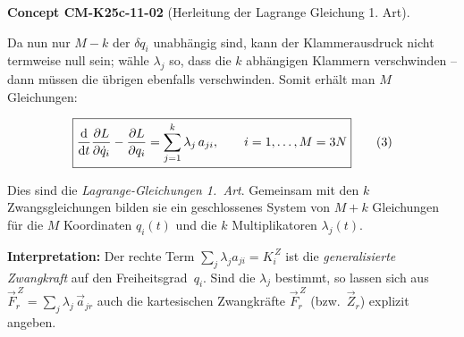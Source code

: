 \documentclass[10pt, letterpaper]{article}
\newcommand{\CustomHeading}[3]{%
  \par\medskip\noindent%
  \textbf{#1 #2} \textnormal{(#3)}.\enskip%
}
\newenvironment{CONC}[2]{\CustomHeading{Concept}{#1}{#2}}{}
\begin{document}
\begin{CONC}{CM-K25c-11-02}{Herleitung der Lagrange Gleichung 1. Art}
Da nun nur $M-k$ der $\delta q_i$ unabhängig sind, kann der Klammer­ausdruck
nicht termweise null sein; wähle $\lambda_j$ so, dass die $k$ abhängigen
Klammern verschwinden – dann müssen die übrigen ebenfalls verschwinden.
Somit erhält man $M$ Gleichungen:

\[
  \boxed{%
    \frac{\mathrm d}{\mathrm dt}
      \frac{\partial L}{\partial\dot q_i}
    -\frac{\partial L}{\partial q_i}
    =\sum_{j=1}^{k}\lambda_j\,a_{ji},
    \qquad
    i=1,\dots,M=3N
  }
  \tag{3}
\]

Dies sind die \emph{Lagrange-Gleichungen 1.\ Art}.  
Gemeinsam mit den $k$ Zwangsgleichungen bilden sie ein geschlossenes
System von $M+k$ Gleichungen für die $M$ Koordinaten $q_i(t)$ und die
$k$ Multiplikatoren $\lambda_j(t)$.

\bigskip
\noindent
\textbf{Interpretation:}  
Der rechte Term
$\displaystyle
  \sum_{j}\lambda_j a_{ji}
  =K_i^{\,Z}
$
ist die \emph{generalisierte Zwangkraft} auf den Freiheitsgrad~$q_i$.
Sind die $\lambda_j$ bestimmt, so lassen sich aus
\(
  \vec F_r^{\,Z}
  =\sum_{j}\lambda_j\,\vec a_{jr}
\)
auch die kartesischen Zwangkräfte $\vec F_r^{\,Z}$ (bzw.\ $\vec Z_r$)
explizit angeben.
\end{CONC}
\end{document}

